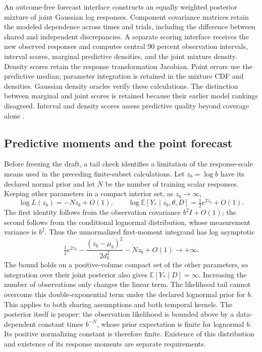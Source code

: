     An outcome-free forecast interface constructs an equally weighted
    posterior mixture of joint Gaussian log responses. Component covariance
    matrices retain the modeled dependence across times and trials, including
    the difference between shared and independent discrepancies. A separate
    scoring interface receives the new observed responses and computes
    central 90 percent observation intervals, interval scores, marginal
    predictive densities, and the joint mixture density. Density scores
    retain the response transformation Jacobian. Point errors use the
    predictive median; parameter integration is retained in the mixture CDF
    and densities. Gaussian density
    oracles verify these calculations. The distinction between marginal
    and joint scores is retained because their earlier model rankings
    disagreed. Interval and density scores assess predictive quality beyond
    coverage alone \citep{gneiting2007proper}.

\subsection{Predictive moments and the point forecast}
\label{sec:predictive-moments}

    Before freezing the draft, a tail check identifies a limitation of the
    response-scale means used in the preceding finite-subset calculations.
    Let \(z_b=\log b\) have its declared normal prior and let \(N\) be the
    number of training scalar responses. Keeping other parameters in a
    compact interior set, as \(z_b\to\infty\),
    \[
        \log L(z_b)=-N z_b+O(1),\qquad
        \log\mathbb E[Y_*\mid z_b,\theta,D]
        =\tfrac12 e^{2z_b}+O(1).
    \]
    The first identity follows from the observation covariance
    \(b^2I+O(1)\); the second follows from the conditional lognormal
    distribution, whose measurement variance is \(b^2\). Thus the
    unnormalized first-moment integrand has log asymptotic
    \[
        \tfrac12 e^{2z_b}
        -\frac{(z_b-\mu_b)^2}{2d_b^2}
        -N z_b+O(1)\longrightarrow+\infty.
    \]
    The bound holds on a positive-volume compact set of the other parameters,
    so integration over their joint posterior also gives
    \(\mathbb E[Y_*\mid D]=\infty\). Increasing the number of observations
    only changes the linear term. The likelihood tail cannot overcome this
    double-exponential term under the declared lognormal prior for \(b\).
    This applies to both sharing assumptions and both temporal kernels.
    The posterior itself is proper: the observation likelihood is bounded
    above by a data-dependent constant times \(b^{-N}\), whose prior
    expectation is finite for lognormal \(b\). Its positive normalizing
    constant is therefore finite. Existence of this distribution and
    existence of its response moments are separate requirements.

